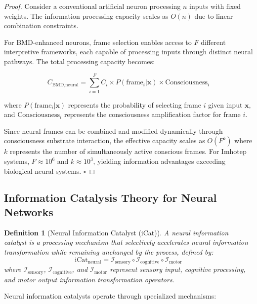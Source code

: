\documentclass[12pt,a4paper]{article}
\newtheorem{definition}[theorem]{Definition}
\theoremstyle{remark}
\begin{document}
\begin{proof}
Consider a conventional artificial neuron processing $n$ inputs with fixed weights. The information processing capacity scales as $O(n)$ due to linear combination constraints.

For BMD-enhanced neurons, frame selection enables access to $F$ different interpretive frameworks, each capable of processing inputs through distinct neural pathways. The total processing capacity becomes:

\begin{equation}
C_{\text{BMD,neural}} = \sum_{i=1}^{F} C_i \times P(\text{frame}_i | \mathbf{x}) \times \text{Consciousness}_i
\end{equation}

where $P(\text{frame}_i | \mathbf{x})$ represents the probability of selecting frame $i$ given input $\mathbf{x}$, and $\text{Consciousness}_i$ represents the consciousness amplification factor for frame $i$.

Since neural frames can be combined and modified dynamically through consciousness substrate interaction, the effective capacity scales as $O(F^k)$ where $k$ represents the number of simultaneously active conscious frames. For Imhotep systems, $F \approx 10^6$ and $k \approx 10^3$, yielding information advantages exceeding biological neural systems. $\square$
\end{proof}

\subsection{Information Catalysis Theory for Neural Networks}

\begin{definition}[Neural Information Catalyst (iCat)]
A neural information catalyst is a processing mechanism that selectively accelerates neural information transformation while remaining unchanged by the process, defined by:
\begin{equation}
\text{iCat}_{\text{neural}} = \mathcal{I}_{\text{sensory}} \circ \mathcal{I}_{\text{cognitive}} \circ \mathcal{I}_{\text{motor}}
\end{equation}
where $\mathcal{I}_{\text{sensory}}$, $\mathcal{I}_{\text{cognitive}}$, and $\mathcal{I}_{\text{motor}}$ represent sensory input, cognitive processing, and motor output information transformation operators.
\end{definition}

Neural information catalysts operate through specialized mechanisms:
\end{document}
